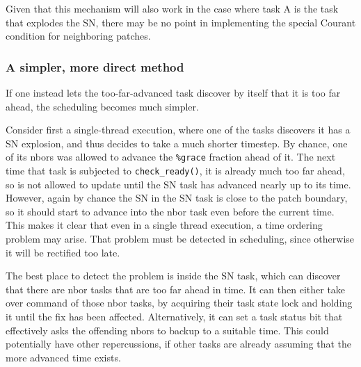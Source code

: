 \documentclass[paper=a4,fontsize=11pt]{scrartcl}
\numberwithin{equation}{section}		%
\numberwithin{figure}{section}			%
\numberwithin{table}{section}				%
\newcommand{\codecolor}{\color{Blue}}
\newcommand{\Code}[1]{{\codecolor\texttt{#1}}}
\def\checkready{\Code{check\_ready()}}
\begin{document}
Given that this mechanism will also work in the case where task A is the task that explodes the SN, there may be no point in implementing the special Courant condition for neighboring patches.

\subsubsection{A simpler, more direct method}
If one instead lets the too-far-advanced task discover by itself that it is too far ahead, the scheduling becomes much simpler.

Consider first a single-thread execution, where one of the tasks discovers it has a SN explosion, and thus decides to take a much shorter timestep.   By chance, one of its nbors was allowed to advance the \verb|%grace| fraction ahead of it.  The next time that task is subjected to \checkready{}, it is already much too far ahead, so is not allowed to update until the SN task has advanced nearly up to its time.  However, again by chance the SN in the SN task is close to the patch boundary, so it should start to advance into the nbor task even before the current time.  This makes it clear that even in a single thread execution, a time ordering problem may arise.  That problem must be detected in scheduling, since otherwise it will be rectified too late.

The best place to detect the problem is inside the SN task, which can discover that there are nbor tasks that are too far ahead in time.  It can then either take over command of those nbor tasks, by acquiring their task state lock and holding it until the fix has been affected.  Alternatively, it can set a task status bit that effectively asks the offending nbors to backup to a suitable time.  This could potentially have other repercussions, if other tasks are already assuming that the more advanced time exists.

\end{document}
